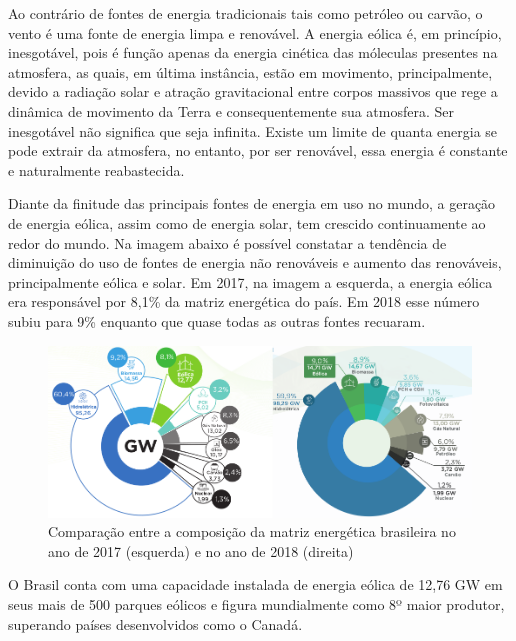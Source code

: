 \documentclass[
	12pt,				%
	openright,			%
	oneside,			%
	a4paper,			%
	english,			%
	french,				%
	spanish,			%
	brazil				%
	]{abntex2}
\begin{document}

Ao contrário de fontes de energia tradicionais tais como petróleo ou carvão, o vento é uma fonte de energia limpa e renovável. A energia eólica é, em princípio, inesgotável, pois é função apenas da energia cinética das móleculas presentes na atmosfera, as quais, em última instância, estão em movimento, principalmente, devido a radiação solar e atração gravitacional entre corpos massivos que rege a dinâmica de movimento da Terra e consequentemente sua atmosfera. Ser inesgotável não significa que seja infinita. Existe um limite de quanta energia se pode extrair da atmosfera, no entanto, por ser renovável, essa energia é constante e naturalmente reabastecida.

Diante da finitude das principais fontes de energia em uso no mundo, a geração de energia eólica, assim como de energia solar, tem crescido continuamente ao redor do mundo. Na imagem abaixo é possível constatar a tendência de diminuição do uso de fontes de energia não renováveis e aumento das renováveis, principalmente eólica e solar. Em 2017, na imagem a esquerda, a energia eólica era responsável por 8,1\% da matriz energética do país. Em 2018 esse número subiu para 9\% enquanto que quase todas as outras fontes recuaram.

\begin{figure}[h]
    \centering
	\includegraphics[width=\textwidth]{abe_2017_2018}
	\caption{Comparação entre a composição da matriz energética brasileira no ano de 2017 (esquerda) e no ano de 2018 (direita)}
\end{figure}
\FloatBarrier

O Brasil conta com uma capacidade instalada de energia eólica de 12,76 GW em seus mais de 500 parques eólicos e figura mundialmente como 8º maior produtor, superando países desenvolvidos como o Canadá.
\end{document}
